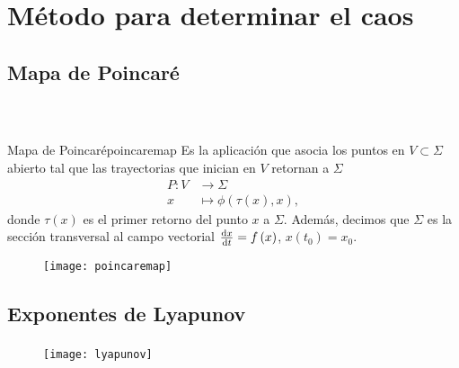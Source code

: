 \section{Método para determinar el caos}

\subsection{Mapa de Poincaré}

\begin{frame}
	\frametitle{\subsecname~\parencite[Sección 5.3, pág. 168]{Viana2021}}

	\begin{minipage}{0.6\textwidth}
		\begin{definition}{Mapa de Poincaré}{poincaremap}
			Es la aplicación que asocia los puntos en $V\subset\Sigma$ abierto
			tal que las trayectorias que inician en $V$ retornan a $\Sigma$
			\begin{align*}
				P\colon V & \to\Sigma                                      \\
				x         & \mapsto\phi\left(\tau\left(x\right), x\right),
			\end{align*}
			donde $\tau\left(x\right)$ es el primer retorno del punto $x$ a $\Sigma$.
			Además, decimos que $\Sigma$ es la sección transversal al campo vectorial
			$\diff{x}{t}=f\left(x\right)$, $x\left(t_{0}\right)=x_{0}$.
		\end{definition}
	\end{minipage}
	\begin{minipage}{0.3\textwidth}
		\begin{figure}[ht!]
			\centering
			\texttt{[image: poincaremap]}
		\end{figure}
	\end{minipage}

\end{frame}


\subsection{Exponentes de Lyapunov}

\begin{frame}
	\frametitle{\subsecname}

	\begin{figure}[ht!]
		\centering
		\texttt{[image: lyapunov]}
	\end{figure}
\end{frame}

